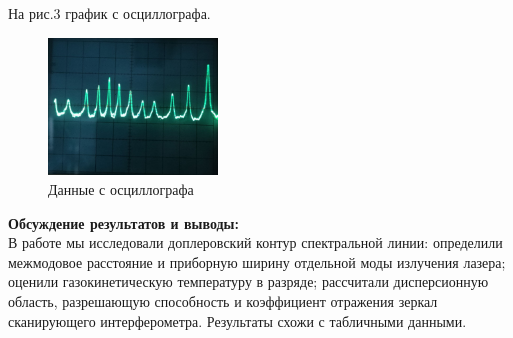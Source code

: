 \documentclass[a4paper, 12pt]{article}%
\begin{document}
	На рис.3 график с осциллографа.
 
	
	\begin{figure}[H]
		\begin{center}
			\includegraphics[width=0.4\textwidth]{Спектр.jpg}
			\caption{Данные с осциллографа}
		\end{center}
	\end{figure}

	
	\textbf{Обсуждение результатов и выводы: }\\
	В работе мы исследовали доплеровский контур спектральной линии: определили межмодовое расстояние и приборную ширину отдельной моды излучения лазера; оценили газокинетическую температуру в разряде; рассчитали дисперсионную область, разрешающую способность и коэффициент отражения зеркал сканирующего интерферометра. Результаты схожи с табличными данными.
	
	
	
\end{document}
